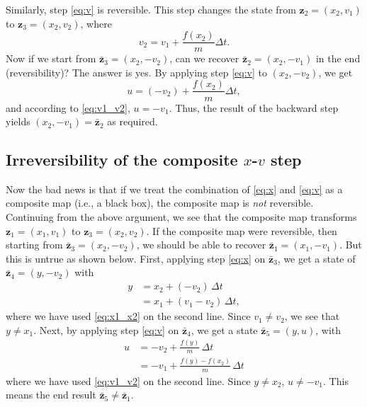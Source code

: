\documentclass{article}
\begin{document}
Similarly, step \eqref{eq:v} is reversible.
This step changes the state from $\mathbf z_2 = (x_2, v_1)$
to $\mathbf z_3 = (x_2, v_2)$, where
\begin{equation}
v_2 = v_1 + \frac{f(x_2)}{m} \Delta t.
\label{eq:v1_v2}
\end{equation}
Now if we start from $\bar{\mathbf z}_3 = (x_2, -v_2)$,
can we recover $\bar{\mathbf z}_2 = (x_2, -v_1)$ in the end
(reversibility)?
%
The answer is yes.
%
By applying step \eqref{eq:v} to $(x_2, -v_2)$, we get
\begin{equation}
u = (-v_2) + \frac{f(x_2)}{m} \Delta t,
\end{equation}
and according to \eqref{eq:v1_v2}, $u = -v_1$.
%
Thus, the result of the backward step yields
$(x_2, -v_1) = \bar{\mathbf z}_2$ as required.

\subsection{Irreversibility of the composite $x$-$v$ step}

Now the bad news is that if we treat the combination
of \eqref{eq:x} and \eqref{eq:v} as a composite map
(i.e., a black box),
the composite map is \emph{not} reversible.
%
Continuing from the above argument,
we see that the composite map transforms ${\mathbf z}_1 = (x_1, v_1)$
to $\mathbf z_3 = (x_2, v_2)$.
If the composite map were reversible,
then starting from $\bar{\mathbf z}_3 = (x_2, -v_2)$,
we should be able to recover $\bar{\mathbf z}_1 = (x_1, -v_1)$.
%
But this is untrue as shown below.
First, applying step \eqref{eq:x} on $\bar{\mathbf z}_3$, we get
a state of $\bar{\mathbf z}_4 = (y, -v_2)$ with
$$
\begin{aligned}
y &= x_2 + (-v_2) \, \Delta t \\
&= x_1 + (v_1 - v_2) \, \Delta t,
\end{aligned}
$$
where we have used \eqref{eq:x1_x2} on the second line.
Since $v_1 \ne v_2$, we see that $y \ne x_1$.
%
Next, by applying step \eqref{eq:v} on $\bar{\mathbf z}_4$,
we get a state $\bar{\mathbf z}_5 = (y, u)$, with
$$
\begin{aligned}
u &= -v_2  + \frac{f(y)}{m} \, \Delta t \\
  &= -v_1  + \frac{f(y) - f(x_2)}{m} \, \Delta t
\end{aligned}
$$
where we have used \eqref{eq:v1_v2} on the second line.
Since $y \ne x_2$, $u \ne -v_1$.
This means the end result $\bar{\mathbf z}_5 \ne \bar{\mathbf z}_1$.
\end{document}
